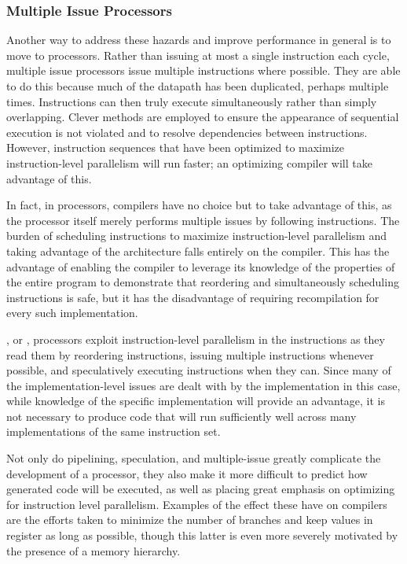 \subsubsection{Multiple Issue Processors}
Another way to address these hazards and improve performance in general is to move to  processors. Rather than issuing at most a single instruction each cycle, multiple issue processors issue multiple instructions where possible. They are able to do this because much of the datapath has been duplicated, perhaps multiple times. Instructions can then truly execute simultaneously rather than simply overlapping. Clever methods are employed to ensure the appearance of sequential execution is not violated and to resolve dependencies between instructions. However, instruction sequences that have been optimized to maximize instruction-level parallelism will run faster; an optimizing compiler will take advantage of this.

In fact, in  processors, compilers have no choice but to take advantage of this, as the processor itself merely performs multiple issues by following instructions. The burden of scheduling instructions to maximize instruction-level parallelism and taking advantage of the architecture falls entirely on the compiler. This has the advantage of enabling the compiler to leverage its knowledge of the properties of the entire program to demonstrate that reordering and simultaneously scheduling instructions is safe, but it has the disadvantage of requiring recompilation for every such implementation. %

, or , processors exploit instruction-level parallelism in the instructions as they read them by reordering instructions, issuing multiple instructions whenever possible, and speculatively executing instructions when they can. Since many of the implementation-level issues are dealt with by the implementation in this case, while knowledge of the specific implementation will provide an advantage, it is not necessary to produce code that will run sufficiently well across many implementations of the same instruction set. %

Not only do pipelining, speculation, and multiple-issue greatly complicate the development of a processor, they also make it more difficult to predict how generated code will be executed, as well as placing great emphasis on optimizing for instruction level parallelism. Examples of the effect these have on compilers are the efforts taken to minimize the number of branches and keep values in register as long as possible, though this latter is even more severely motivated by the presence of a memory hierarchy.

